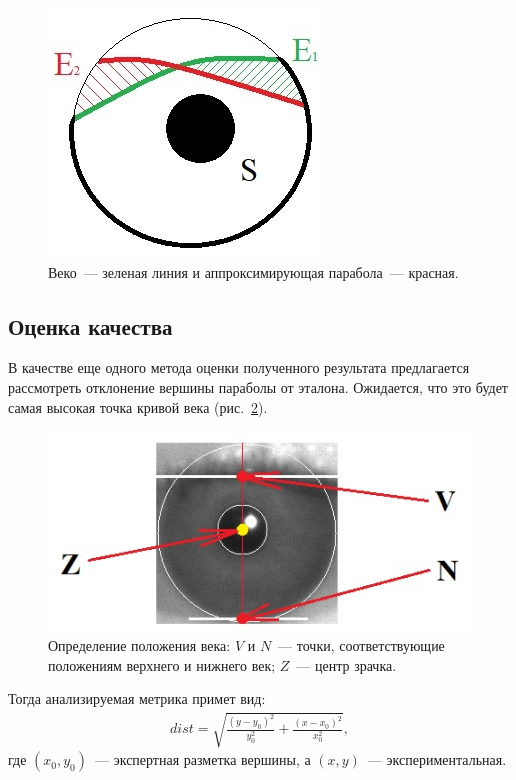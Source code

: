 \documentclass[12pt,a4paper]{article} %
\begin{document}
\begin{figure}[h]
	
	\centering
	
	\includegraphics[width=0.28\linewidth]{glaz8.jpg}
	
	\caption{Веко~--- зеленая линия и аппроксимирующая парабола~--- красная.}
	
	\label{fig:glaz8}
	
\end{figure}
\newpage
\subsection{Оценка качества}

В качестве еще одного метода оценки полученного результата предлагается рассмотреть отклонение вершины параболы от эталона. Ожидается, что это будет самая высокая точка кривой века (рис.~\ref{fig:glaz2}).

\begin{figure}[h]
	
	\centering
	
	\includegraphics[width=0.6\linewidth]{glaz2.jpg}
	
	\caption{Определение положения века: $V$ и $N$~--- точки, соответствующие положениям верхнего и нижнего век; $Z$~--- центр зрачка.}
	
	\label{fig:glaz2}
	
\end{figure}

Тогда анализируемая метрика примет вид:
\begin{gather}\label{dist}
dist = \sqrt{\frac{(y-y_0)^2}{y_0^2}+\frac{(x-x_0)^2}{x_0^2}},
\end{gather}
где $(x_0, y_0)$~--- экспертная разметка вершины, а $(x,y)$~--- экспериментальная.
\end{document}

